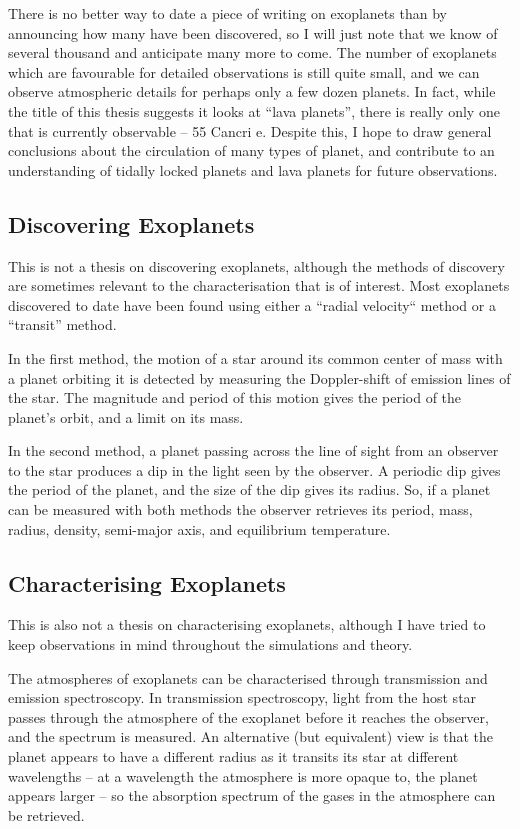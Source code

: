 There is no better way to date a piece of writing on exoplanets than by announcing how many have been discovered, so I will just note that we know of several thousand and anticipate many more to come. The number of exoplanets which are favourable for detailed observations is still quite small, and we can observe atmospheric details for perhaps only a few dozen planets. In fact, while the title of this thesis suggests it looks at ``lava planets'', there is really only one that is currently observable -- 55 Cancri e. Despite this, I hope to draw general conclusions about the circulation of many types of planet, and contribute to an understanding of tidally locked planets and lava planets for future observations.


\subsection*{Discovering Exoplanets}

This is not a thesis on discovering exoplanets, although the methods of discovery are sometimes relevant to the characterisation that is of interest. Most exoplanets discovered to date have been found using either a ``radial velocity`` method or a ``transit'' method.

In the first method, the motion of a star around its common center of mass with a planet orbiting it is detected by measuring the Doppler-shift of emission lines of the star. The magnitude and period of this motion gives the period of the planet's orbit, and a limit on its mass.

In the second method, a planet passing across the line of sight from an observer to the star produces a dip in the light seen by the observer. A periodic dip gives the period of the planet, and the size of the dip gives its radius. So, if a planet can be measured with both methods the observer retrieves its period, mass, radius, density, semi-major axis, and equilibrium temperature.


\subsection*{Characterising Exoplanets}

This is also not a thesis on characterising exoplanets, although I have tried to keep observations in mind throughout the simulations and theory.

The atmospheres of exoplanets can be characterised through transmission and emission spectroscopy. In transmission spectroscopy, light from the host star passes through the atmosphere of the exoplanet before it reaches the observer, and the spectrum is measured. An alternative (but equivalent) view is that the planet appears to have a different radius as it transits its star at different wavelengths -- at a wavelength the atmosphere is more opaque to, the planet appears larger -- so the absorption spectrum of the gases in the atmosphere can be retrieved.

